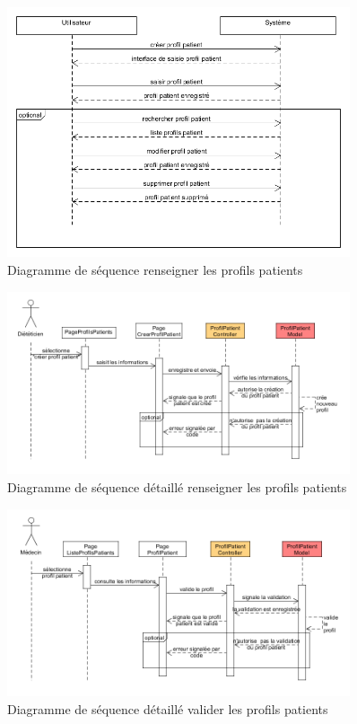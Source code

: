 \begin{figure}
  \label{diagramme-renseigner-les-profils-patients}
  \centering
  \includegraphics[width=0.9\textwidth]{../../CasDUtilisations/ProfilPatient/diagseqProfilPatient.png}
  \caption{Diagramme de séquence renseigner les profils patients}
\end{figure}

\begin{figure}
  \label{diagramme-renseigner-les-profils-patients}
  \centering
  \includegraphics[width=0.9\textwidth]{../../CasDUtilisations/ProfilPatient/diagSrqDetaillProfilPatient.png}
  \caption{Diagramme de séquence détaillé renseigner les profils patients}
\end{figure}

\begin{figure}
  \label{diagramme-renseigner-les-profils-patients}
  \centering
  \includegraphics[width=0.9\textwidth]{../../CasDUtilisations/ProfilPatient/diagSrqDetaillValidProfilPatient.png}
  \caption{Diagramme de séquence détaillé valider les profils patients}
\end{figure}
